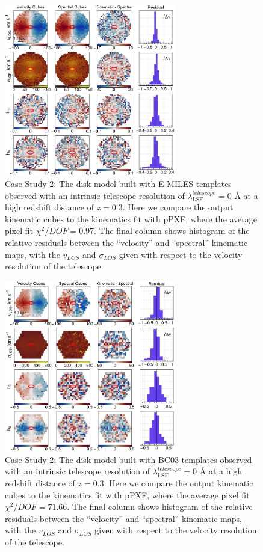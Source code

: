 \documentclass[
  journal=pasa,
  manuscript=research-paper, %
  year=2020,
  volume=37,
]{cup-journal}
\begin{document}

\begin{figure}
    \centering
    \includegraphics[keepaspectratio, width=7.5cm]{cs2_disk_velocities_highz_EMILES.jpeg}
    \caption{Case Study 2: The disk model built with E-MILES templates observed with an intrinsic telescope resolution of  $\lambda_{\text{LSF}}^{telescope} = 0$ \AA{} at a high redshift distance of $z = 0.3$. Here we compare the output kinematic cubes to the kinematics fit with pPXF, where the average pixel fit $\chi^2/DOF = 0.97$. The final column shows histogram of the relative residuals between the ``velocity'' and ``spectral'' kinematic maps, with the $v_{LOS}$ and $\sigma_{LOS}$ given with respect to the velocity resolution of the telescope. }
    \label{fig:cs2_disk_E-MILES}
\end{figure}

\begin{figure}
    \centering
    \includegraphics[keepaspectratio, width=7.5cm]{cs2_disk_velocities_highz_BC03.jpeg}
    \caption{Case Study 2: The disk model built with BC03 templates observed with an intrinsic telescope resolution of  $\lambda_{\text{LSF}}^{telescope} = 0$ \AA{} at a high redshift distance of $z = 0.3$. Here we compare the output kinematic cubes to the kinematics fit with pPXF, where the average pixel fit $\chi^2/DOF = 71.66$. The final column shows histogram of the relative residuals between the ``velocity'' and ``spectral'' kinematic maps, with the $v_{LOS}$ and $\sigma_{LOS}$ given with respect to the velocity resolution of the telescope.}
    \label{fig:cs2_disk_BC03}
\end{figure}
\end{document}
